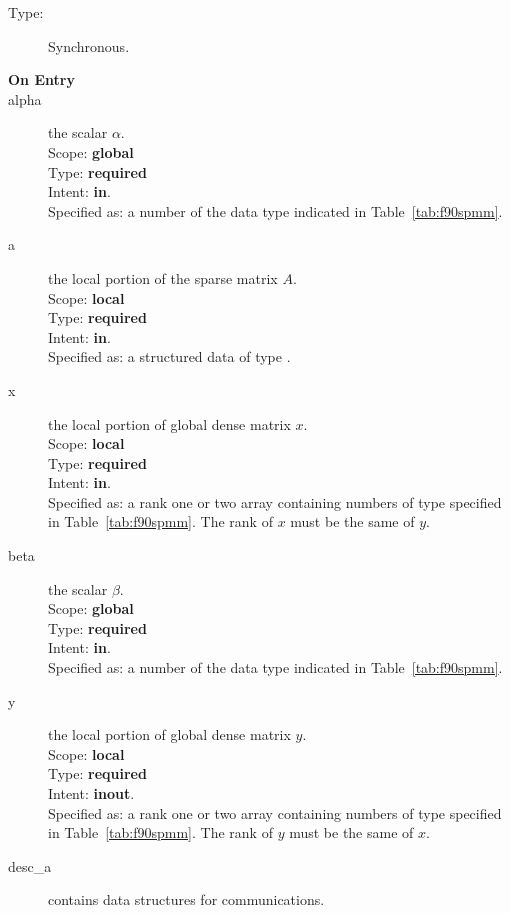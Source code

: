 \begin{description}
\item[Type:] Synchronous.
\item[\bf On Entry]
\item[alpha] the scalar $\alpha$.\\
Scope: {\bf global} \\
Type: {\bf required}\\
Intent: {\bf in}.\\
Specified as: a number of the data type indicated in
Table~\ref{tab:f90spmm}. 
\item[a] the local portion of the sparse matrix
$A$. \\ 
Scope: {\bf local} \\
Type: {\bf required}\\
Intent: {\bf in}.\\
Specified as: a structured data of type \spdata.
\item[x] the local portion of global dense matrix
$x$. %
\\
Scope: {\bf local} \\
Type: {\bf required} \\
Intent: {\bf in}.\\
Specified as:  a rank one or two array
containing numbers of type specified in
Table~\ref{tab:f90spmm}.  The rank of $x$ must be the same of $y$. 
\item[beta] the scalar $\beta$.\\
Scope: {\bf global} \\
Type: {\bf required} \\
Intent: {\bf in}.\\
Specified as: a number of the data type indicated in Table~\ref{tab:f90spmm}.
\item[y] the local portion of global dense matrix
$y$. %
\\
Scope: {\bf local} \\
Type: {\bf required} \\
Intent: {\bf inout}.\\
Specified as:  a rank one or two array 
containing numbers of type specified in
Table~\ref{tab:f90spmm}. The rank of $y$ must be the same of $x$. 
\item[desc\_a] contains data structures for communications.\\

\end{description}
